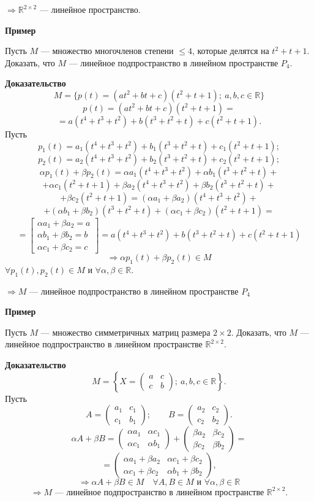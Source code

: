 \documentclass[12pt,a4paper]{article}
\begin{document}
$\Rightarrow\mathbb R^{2\times2}$ --- линейное пространство.

\textbf{Пример}

Пусть $M$ --- множество многочленов степени $\le4$, которые делятся
на $t^2+t+1$. Доказать, что $M$ --- линейное подпространство в
линейном пространстве $P_4$.

\textbf{Доказательство}
$$
M=\{p(t)=(at^2+bt+c)(t^2+t+1);\ a,b,c\in\mathbb R\}
$$
$$
p(t)=(at^2+bt+c)(t^2+t+1)=
$$
$$
=a(t^4+t^3+t^2)+b(t^3+t^2+t)+c(t^2+t+1).
$$
Пусть
$$
p_1(t)=a_1(t^4+t^3+t^2)+b_1(t^3+t^2+t)+c_1(t^2+t+1);
$$
$$
p_2(t)=a_2(t^4+t^3+t^2)+b_2(t^3+t^2+t)+c_2(t^2+t+1);
$$
$$
\alpha p_1(t)+\beta p_2(t)=\alpha a_1(t^4+t^3+t^2)+\alpha b_1(t^3+t^2+t)+
$$
$$
+\alpha c_1(t^2+t+1)+\beta a_2(t^4+t^3+t^2)+\beta b_2(t^3+t^2+t)+
$$
$$
+\beta c_2(t^2+t+1)=(\alpha a_1+\beta a_2)(t^4+t^3+t^2)+
$$
$$
+(\alpha b_1+\beta b_2)(t^3+t^2+t)+(\alpha c_1+\beta c_2)(t^2+t+1)=
$$
$$
=\left[
\begin{array}{l}
\alpha a_1+\beta a_2=a\\
\alpha b_1+\beta b_2=b\\
\alpha c_1+\beta c_2=c
\end{array}
\right]=a(t^4+t^3+t^2)+b(t^3+t^2+t)+c(t^2+t+1)
$$
$$
\Rightarrow \alpha p_1(t)+\beta p_2(t)\in M
$$
$\forall p_1(t),p_2(t)\in M$ и $\forall\alpha,\beta\in\mathbb R$.

$\Rightarrow M$ --- линейное подпространство в линейном пространстве $P_4$

\textbf{Пример}

Пусть $M$ --- множество симметричных матриц размера $2\times2$.
Доказать, что $M$ --- линейное подпространство в линейном
пространстве $\mathbb R^{2\times2}$.

\textbf{Доказательство}
$$
M=\left\{X=
\begin{pmatrix}a&c\\ c&b
\end{pmatrix};\ a,b,c\in\mathbb R\right\}.
$$
Пусть
$$
A=
\begin{pmatrix}a_1&c_1\\ c_1&b_1
\end{pmatrix};\qquad
B=
\begin{pmatrix}a_2&c_2\\ c_2&b_2
\end{pmatrix}.
$$
$$
\alpha A+\beta B=
\begin{pmatrix}\alpha a_1&\alpha c_1\\ \alpha c_1&\alpha b_1
\end{pmatrix}+
\begin{pmatrix}\beta a_2&\beta c_2\\ \beta c_2&\beta b_2
\end{pmatrix}=
$$
$$
=
\begin{pmatrix}
\alpha a_1+\beta a_2&\alpha c_1+\beta c_2\\
\alpha c_1+\beta c_2&\alpha b_1+\beta b_2
\end{pmatrix},
$$
$$
\Rightarrow \alpha A+\beta B\in M \quad \forall A,B\in M \text{ и }
\forall\alpha,\beta\in\mathbb R
$$
$$
\Rightarrow M \text{ --- линейное подпространство в линейном
пространстве } \mathbb R^{2\times2}.
$$
\end{document}
